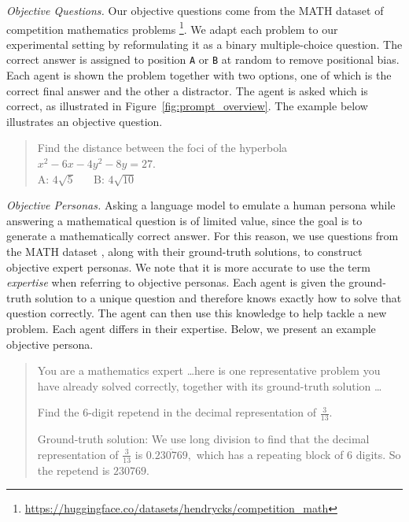\textit{Objective Questions.} Our objective questions come from the MATH dataset of
competition mathematics problems \citep{hendrycks2021measuringmathematicalproblemsolving}\footnote{\url{https://huggingface.co/datasets/hendrycks/competition_math}}. We adapt each problem to our experimental
setting by reformulating it as a binary multiple-choice question. The correct answer is
assigned to position \texttt{A} or \texttt{B} at random to remove positional bias. Each agent is shown the
problem together with two options, one of which is the correct final answer and the other a distractor. The agent is asked
which is correct, as illustrated in Figure~\ref{fig:prompt_overview}. The example below illustrates an objective question.
\begin{quote}\small
Find the distance between the foci of the hyperbola $x^2 - 6x - 4y^2 - 8y = 27.$\\
A: $4\sqrt{5}$ $\quad$ B: $4\sqrt{10}$
\end{quote}

\textit{Objective Personas.} Asking a language model to emulate a human persona while answering a mathematical question is of limited value, since the goal is to generate a mathematically correct answer. For this reason, we use questions from the MATH dataset \citep{hendrycks2021measuringmathematicalproblemsolving}, along with their ground-truth solutions, to construct objective expert personas. We note that it is more accurate to use the term \emph{expertise} when referring to objective personas.  Each agent is given the ground-truth solution to a unique question and therefore knows exactly how to solve that question correctly. The agent can then use this knowledge to help tackle a new problem. Each agent differs in their expertise. Below, we present an example objective persona.
\begin{quote}\small
You are a mathematics expert \dots here is one representative problem you have already solved correctly, together with its ground-truth solution \dots

Find the 6-digit repetend in the decimal representation of $\frac{3}{13}.$

Ground-truth solution:
We use long division to find that the decimal representation of $\frac{3}{13}$ is $0.\overline{230769},$ which has a repeating block of 6 digits. So the repetend is $\boxed{230769}.$
\end{quote}

